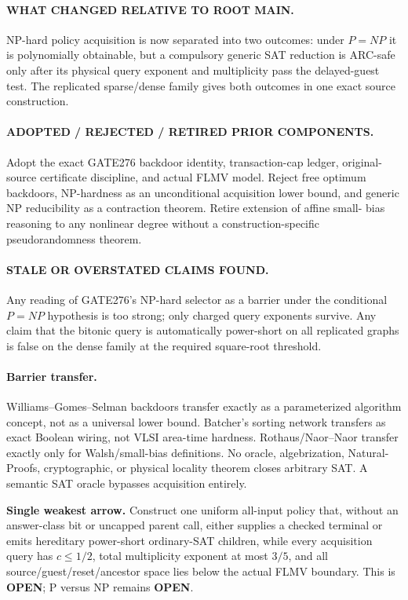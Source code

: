 \documentclass[11pt]{article}
\begin{document}
\paragraph{WHAT CHANGED RELATIVE TO ROOT MAIN.}
NP-hard policy acquisition is now separated into two outcomes: under $P=NP$ it
is polynomially obtainable, but a compulsory generic SAT reduction is ARC-safe
only after its physical query exponent and multiplicity pass the delayed-guest
test.  The replicated sparse/dense family gives both outcomes in one exact
source construction.

\paragraph{ADOPTED / REJECTED / RETIRED PRIOR COMPONENTS.}
Adopt the exact GATE276 backdoor identity, transaction-cap ledger, original-
source certificate discipline, and actual FLMV model.  Reject free optimum
backdoors, NP-hardness as an unconditional acquisition lower bound, and generic
NP reducibility as a contraction theorem.  Retire extension of affine small-
bias reasoning to any nonlinear degree without a construction-specific
pseudorandomness theorem.

\paragraph{STALE OR OVERSTATED CLAIMS FOUND.}
Any reading of GATE276's NP-hard selector as a barrier under the conditional
$P=NP$ hypothesis is too strong; only charged query exponents survive.  Any
claim that the bitonic query is automatically power-short on all replicated
graphs is false on the dense family at the required square-root threshold.

\paragraph{Barrier transfer.}
Williams--Gomes--Selman backdoors transfer exactly as a parameterized algorithm
concept, not as a universal lower bound.  Batcher's sorting network transfers
as exact Boolean wiring, not VLSI area-time hardness.  Rothaus/Naor--Naor
transfer exactly only for Walsh/small-bias definitions.  No oracle,
algebrization, Natural-Proofs, cryptographic, or physical locality theorem
closes arbitrary SAT.  A semantic SAT oracle bypasses acquisition entirely.

\textbf{Single weakest arrow.}  Construct one uniform all-input policy that,
without an answer-class bit or uncapped parent call, either supplies a checked
terminal or emits hereditary power-short ordinary-SAT children, while every
acquisition query has $c\le1/2$, total multiplicity exponent at most $3/5$,
and all source/guest/reset/ancestor space lies below the actual FLMV boundary.
This is \textbf{OPEN}; P versus NP remains \textbf{OPEN}.
\end{document}
